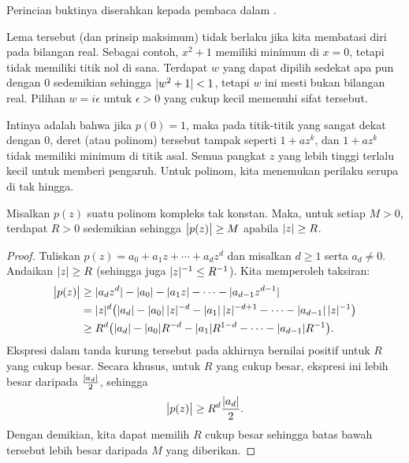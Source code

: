Perincian buktinya diserahkan kepada pembaca dalam
.

\begin{remark}
Lema tersebut (dan prinsip maksimum) tidak berlaku jika kita membatasi diri pada bilangan real.  Sebagai
contoh, $x^2+1$ memiliki minimum di $x=0$, tetapi tidak memiliki titik nol di sana.
Terdapat $w$ yang dapat dipilih sedekat apa pun dengan $0$ sedemikian sehingga $\lvert {w^2+1} \rvert < 1$, tetapi
$w$ ini mesti bukan bilangan real.  Pilihan $w = i\epsilon$ untuk
$\epsilon > 0$ yang cukup kecil memenuhi sifat tersebut.
\end{remark}

Intinya adalah bahwa jika $p(0) = 1$, maka pada titik-titik yang sangat dekat dengan 0,
deret (atau polinom) tersebut
tampak seperti $1+az^k$, dan $1+az^k$ tidak memiliki minimum di titik asal.  Semua
pangkat $z$ yang lebih tinggi terlalu kecil untuk memberi pengaruh.  Untuk polinom, kita menemukan perilaku serupa
di tak hingga.

\begin{lemma}
Misalkan $p(z)$ suatu polinom kompleks tak konstan.  Maka, untuk setiap $M > 0$, terdapat
$R > 0$ sedemikian sehingga
$\bigl\lvert {p(z)} \bigr\rvert \geq M$ apabila $\lvert {z} \rvert \geq R$.
\end{lemma}

\begin{proof}
Tuliskan $p(z) = a_0 + a_1 z + \cdots + a_d z^d$ dan misalkan $d \geq 1$
serta $a_d \neq 0$.
Andaikan $\lvert {z} \rvert \geq R$ (sehingga juga $\lvert {z} \rvert^{-1} \leq R^{-1}$).
Kita memperoleh taksiran:
\begin{equation*}
\begin{split}
\bigl\lvert {p(z)} \bigr\rvert
& \geq
\lvert {a_d z^d} \rvert -
\lvert {a_0} \rvert - \lvert {a_1 z} \rvert - \cdots - \lvert {a_{d-1} z^{d-1} } \rvert
\\
& =
\lvert {z} \rvert^d \bigl(
\lvert {a_d} \rvert -
\lvert {a_0} \rvert \, \lvert {z} \rvert^{-d} -
\lvert {a_1} \rvert \, \lvert {z} \rvert^{-d+1} - \cdots - \lvert {a_{d-1}} \rvert \, \lvert {z} \rvert^{-1}
\bigr)
\\
& \geq
R^d \bigl(\lvert {a_d} \rvert -
\lvert {a_0} \rvert R^{-d} - \lvert {a_1} \rvert R^{1-d} - \cdots - \lvert {a_{d-1}} \rvert R^{-1} \bigr)
.
\end{split}
\end{equation*}
Ekspresi dalam tanda kurung tersebut pada akhirnya bernilai positif untuk
$R$ yang cukup besar.  Secara khusus, untuk $R$ yang cukup besar, ekspresi ini
lebih besar daripada
$\frac{\lvert {a_d} \rvert}{2}$, sehingga
\begin{equation*}
\bigl\lvert {p(z)} \bigr\rvert
\geq
R^d \frac{\lvert {a_d} \rvert}{2} .
\end{equation*}
Dengan demikian,
kita dapat memilih $R$ cukup besar sehingga batas bawah tersebut lebih besar daripada $M$ yang diberikan.
\end{proof}

